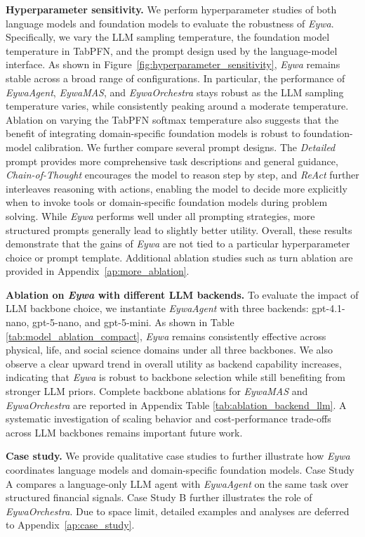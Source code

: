 \textbf{Hyperparameter sensitivity.} We perform hyperparameter studies of both language models and foundation models to evaluate the robustness of \textit{Eywa}. Specifically, we vary the LLM sampling temperature, the foundation model temperature in TabPFN, and the prompt design used by the language-model interface. As shown in Figure~\ref{fig:hyperparameter_sensitivity}, \textit{Eywa} remains stable across a broad range of configurations. In particular, the performance of \textit{EywaAgent}, \textit{EywaMAS}, and \textit{EywaOrchestra} stays robust as the LLM sampling temperature varies, while consistently peaking around a moderate temperature. Ablation on varying the TabPFN softmax temperature also suggests that the benefit of integrating domain-specific foundation models is robust to foundation-model calibration. We further compare several prompt designs. The \textit{Detailed} prompt provides more comprehensive task descriptions and general guidance, \textit{Chain-of-Thought} \cite{DBLP:conf/nips/Wei0SBIXCLZ22} encourages the model to reason step by step, and \textit{ReAct} \cite{DBLP:conf/iclr/YaoZYDSN023} further interleaves reasoning with actions, enabling the model to decide more explicitly when to invoke tools or domain-specific foundation models during problem solving. While \textit{Eywa} performs well under all prompting strategies, more structured prompts generally lead to slightly better utility. Overall, these results demonstrate that the gains of \textit{Eywa} are not tied to a particular hyperparameter choice or prompt template. Additional ablation studies such as turn ablation are provided in Appendix~\ref{ap:more_ablation}.






\textbf{Ablation on \textit{Eywa} with different LLM backends.} 
To evaluate the impact of LLM backbone choice, we instantiate \textit{EywaAgent} with three backends: gpt-4.1-nano, gpt-5-nano, and gpt-5-mini.
As shown in Table \ref{tab:model_ablation_compact}, \textit{Eywa} remains consistently effective across physical, life, and social science domains under all three backbones.
We also observe a clear upward trend in overall utility as backend capability increases, indicating that \textit{Eywa} is robust to backbone selection while still benefiting from stronger LLM priors.
Complete backbone ablations for \textit{EywaMAS} and \textit{EywaOrchestra} are reported in Appendix Table \ref{tab:ablation_backend_llm}.
A systematic investigation of scaling behavior and cost-performance trade-offs across LLM backbones remains important future work.



\textbf{Case study.} We provide qualitative case studies to further illustrate how \textit{Eywa} coordinates language models and domain-specific foundation models. Case Study A compares a language-only LLM agent with \textit{EywaAgent} on the same task over structured financial signals. Case Study B further illustrates the role of \textit{EywaOrchestra}. Due to space limit, detailed examples and analyses are deferred to Appendix~\ref{ap:case_study}.